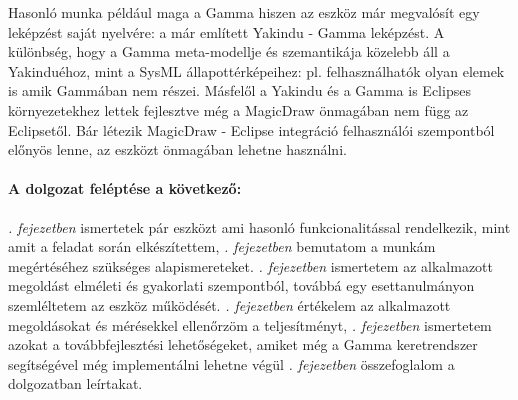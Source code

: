Hasonló munka például maga a Gamma hiszen az eszköz már megvalósít egy leképzést saját nyelvére: a már említett Yakindu - Gamma leképzést. A különbség, hogy a Gamma meta-modellje és szemantikája közelebb áll a Yakinduéhoz, mint a SysML állapottérképeihez: pl. felhasználhatók olyan elemek is amik Gammában nem részei. Másfelől a Yakindu és a Gamma is Eclipses környezetekhez lettek fejlesztve még a MagicDraw önmagában nem függ az Eclipsetől. Bár létezik MagicDraw - Eclipse integráció felhasználói szempontból előnyös lenne, az eszközt önmagában lehetne használni.

\paragraph{A dolgozat feléptése a következő:} \emph{. fejezetben} ismertetek pár eszközt ami hasonló funkcionalitással rendelkezik, mint amit a feladat során elkészítettem, \emph{. fejezetben} bemutatom a munkám megértéséhez szükséges alapismereteket. \emph{. fejezetben} ismertetem az alkalmazott megoldást elméleti és gyakorlati szempontból, továbbá egy esettanulmányon szemléltetem az eszköz működését. \emph{. fejezetben} értékelem az alkalmazott megoldásokat és mérésekkel ellenőrzöm a teljesítményt, \emph{. fejezetben} ismertetem azokat a továbbfejlesztési lehetőségeket, amiket még a Gamma keretrendszer segítségével még implementálni lehetne végül \emph{. fejezetben} összefoglalom a dolgozatban leírtakat.


